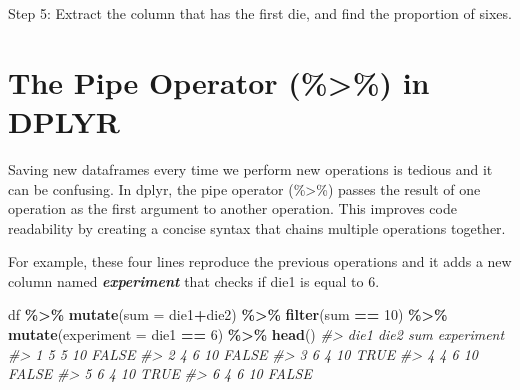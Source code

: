 \documentclass[
]{book}
\newenvironment{Shaded}{\begin{snugshade}}{\end{snugshade}}
\newcommand{\AttributeTok}[1]{\textcolor[rgb]{0.13,0.29,0.53}{#1}}
\newcommand{\CommentTok}[1]{\textcolor[rgb]{0.56,0.35,0.01}{\textit{#1}}}
\newcommand{\DecValTok}[1]{\textcolor[rgb]{0.00,0.00,0.81}{#1}}
\newcommand{\FunctionTok}[1]{\textcolor[rgb]{0.13,0.29,0.53}{\textbf{#1}}}
\newcommand{\NormalTok}[1]{#1}
\newcommand{\SpecialCharTok}[1]{\textcolor[rgb]{0.81,0.36,0.00}{\textbf{#1}}}
\theoremstyle{definition}
\theoremstyle{definition}
\theoremstyle{definition}
\theoremstyle{definition}
\theoremstyle{remark}
\begin{document}
Step 5: Extract the column that has the first die, and find the proportion of sixes.

\begin{Shaded}
\end{Shaded}

\hypertarget{the-pipe-operator-in-dplyr}{%
\section{The Pipe Operator (\%\textgreater\%) in DPLYR}\label{the-pipe-operator-in-dplyr}}

Saving new dataframes every time we perform new operations is tedious and it can be confusing. In dplyr, the pipe operator (\%\textgreater\%) passes the result of one operation as the first argument to another operation. This improves code readability by creating a concise syntax that chains multiple operations together.

For example, these four lines reproduce the previous operations and it adds a new column named \textbf{\emph{experiment}} that checks if die1 is equal to 6.

\begin{Shaded}
\begin{Highlighting}[]
\NormalTok{df }\SpecialCharTok{\%\textgreater{}\%} 
  \FunctionTok{mutate}\NormalTok{(}\AttributeTok{sum =}\NormalTok{ die1}\SpecialCharTok{+}\NormalTok{die2) }\SpecialCharTok{\%\textgreater{}\%}
  \FunctionTok{filter}\NormalTok{(sum }\SpecialCharTok{==} \DecValTok{10}\NormalTok{) }\SpecialCharTok{\%\textgreater{}\%}
  \FunctionTok{mutate}\NormalTok{(}\AttributeTok{experiment =}\NormalTok{ die1 }\SpecialCharTok{==} \DecValTok{6}\NormalTok{) }\SpecialCharTok{\%\textgreater{}\%}
  \FunctionTok{head}\NormalTok{()}
\CommentTok{\#\textgreater{}   die1 die2 sum experiment}
\CommentTok{\#\textgreater{} 1    5    5  10      FALSE}
\CommentTok{\#\textgreater{} 2    4    6  10      FALSE}
\CommentTok{\#\textgreater{} 3    6    4  10       TRUE}
\CommentTok{\#\textgreater{} 4    4    6  10      FALSE}
\CommentTok{\#\textgreater{} 5    6    4  10       TRUE}
\CommentTok{\#\textgreater{} 6    4    6  10      FALSE}
\end{Highlighting}
\end{Shaded}
\end{document}
